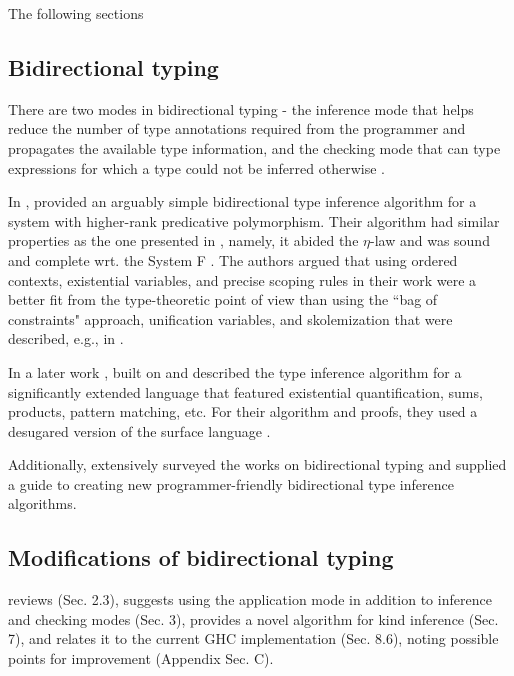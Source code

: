 The following sections

\subsection{Bidirectional typing}

There are two modes in bidirectional typing - the inference mode that helps reduce the number of type annotations required from the programmer and propagates the available type information, and the checking mode that can type expressions for which a type could not be inferred otherwise \cite{dunfield-bidirectional-2020}.

In \cite{dunfield-complete-2013}, \citeauthor{dunfield-complete-2013} provided an arguably simple bidirectional type inference algorithm for a system with higher-rank predicative polymorphism. Their algorithm had similar properties \cite[Fig. 15]{dunfield-complete-2013} as the one presented in \cite[Sec.~6]{jones-practical-2007}, namely, it abided the $\eta$-law \cite[Ch.~4]{selinger-lecture-2013} and was sound and complete wrt. the System F \cite[Ch.~8]{selinger-lecture-2013}. The authors argued that using ordered contexts, existential variables, and precise scoping rules in their work were a better fit from the type-theoretic point of view than using the ``bag of constraints" approach, unification variables, and skolemization that were described, e.g., in \cite{jones-practical-2007}.

In a later work \cite{dunfield-sound-2019}, \citeauthor{dunfield-sound-2019} built on \cite{dunfield-complete-2013} and described the type inference algorithm for a significantly extended language that featured existential quantification, sums, products, pattern matching, etc. For their algorithm and proofs, they used a desugared version \cite[Fig. 11]{dunfield-sound-2019} of the surface language \cite[Fig. 1]{dunfield-sound-2019}.

Additionally, \citeauthor{dunfield-bidirectional-2020} extensively surveyed \cite{dunfield-bidirectional-2020} the works on bidirectional typing and supplied a guide to creating new programmer-friendly bidirectional type inference algorithms.

\subsection{Modifications of bidirectional typing}

\citeauthor{xie-higher-rank} \cite{xie-higher-rank} reviews \cite{dunfield-complete-2013} (Sec. 2.3), suggests using the application mode in addition to inference and checking modes (Sec. 3), provides a novel algorithm for kind inference (Sec. 7), and relates it to the current GHC implementation (Sec. 8.6), noting possible points for improvement (Appendix Sec. C).

